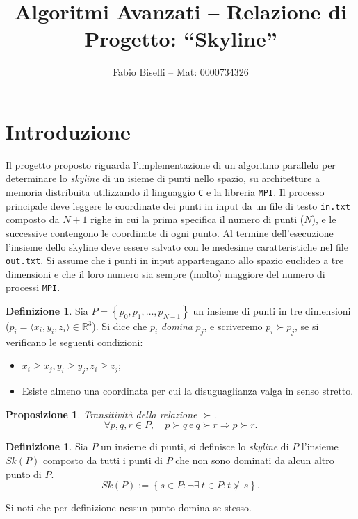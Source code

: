 \documentclass[a4paper, 11pt]{article}
\author{Fabio Biselli -- Mat: 0000734326}
\title{Algoritmi Avanzati -- Relazione di Progetto: ``Skyline''}
\date{}
\newcommand{\rr}{\mathbb{R}}
\newtheorem{prop}[teo]{Proposizione}
\theoremstyle{definition}
\newtheorem{defi}[teo]{Definizione}
\theoremstyle{remark}
\begin{document}
\maketitle

\section{Introduzione}
Il progetto proposto riguarda l'implementazione di un algoritmo parallelo
per determinare lo \emph{skyline} di un isieme di punti nello spazio,
su architetture a memoria distribuita utilizzando il linguaggio \texttt{C} e
la libreria \texttt{MPI}. Il processo principale deve leggere le coordinate
dei punti in input da un file di testo \texttt{in.txt} composto da $N + 1$ righe
in cui la prima specifica il numero di punti ($N$), e le successive contengono
le coordinate di ogni punto. Al termine dell'esecuzione l'insieme dello
skyline deve essere salvato con le medesime caratteristiche nel file
\texttt{out.txt}. Si assume che i punti in input appartengano allo spazio
euclideo a tre dimensioni e che il loro numero sia sempre (molto) maggiore
del numero di processi \texttt{MPI}.

\begin{defi}
Sia $P = \left\{ p_0, p_1, \ldots, p_{N-1}\right\}$ un insieme di punti in tre
dimensioni ($p_i = \langle x_i, y_i, z_i\rangle \in \rr^3$). Si dice che $p_i$
\emph{domina} $p_j$, e scriveremo $p_i \succ p_j$,
se si verificano le seguenti condizioni:
\begin{itemize}
\item
$x_i \ge x_j, y_i \ge y_j, z_i \ge z_j$;
\item
Esiste almeno una coordinata per cui la disuguaglianza valga in senso stretto.
\end{itemize}
\end{defi}

\begin{prop}
Transitività della relazione $\succ$.
\[
\forall p, q, r \in P,\quad
p \succ q\ \text{e}\ q \succ r \Rightarrow p \succ r.
\]
\end{prop}

\begin{defi}
Sia $P$ un insieme di punti, si definisce lo \emph{skyline} di $P$ l'insieme
$Sk(P)$ composto da tutti i punti di $P$ che non sono dominati da alcun altro
punto di $P$.
\[
Sk(P) := \left\{
s \in P \colon \neg \exists\ t \in P \colon t \not\succ s
\right\}.
\]
\end{defi}
Si noti che per definizione nessun punto domina se stesso.
\end{document}
